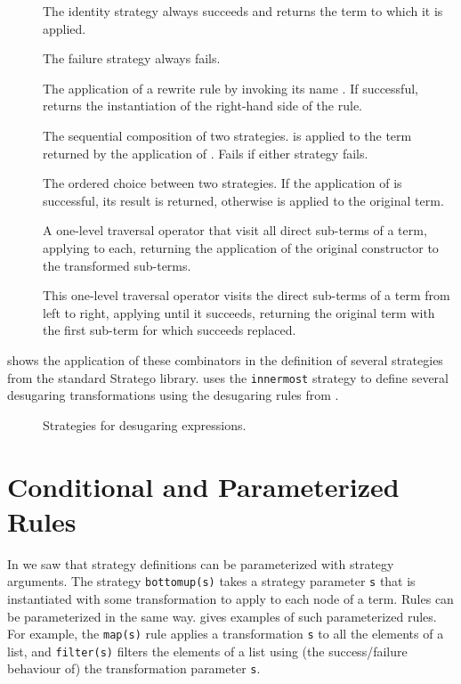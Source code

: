 \begin{description}
\item[] The identity strategy always succeeds and returns the term
to which it is applied.
\item[] The failure strategy always fails.
\item[] The application of a rewrite rule by invoking its name
. If successful, returns the instantiation of the right-hand side
of the rule.
\item[] The sequential composition of two strategies.
 is applied to the term returned by the
application of . Fails if either strategy fails.
\item[] The ordered choice between two strategies.
If the application of  is successful, its result is returned,
otherwise  is applied to the original term.
\item[] A one-level traversal operator that visit all direct
sub-terms of a term, applying  to each, returning the application
of the original constructor to the transformed sub-terms.
\item[] This one-level traversal operator visits the direct
sub-terms of a term from left to right, applying  until it
succeeds, returning the original term with the first sub-term for which
 succeeds replaced.
\end{description}

 shows the application of these combinators in the
definition of several strategies from the standard Stratego library.
 uses the \texttt{innermost} strategy to define several
desugaring transformations using the desugaring rules from
.

\begin{figure}[t]

\caption{Strategies for desugaring expressions.}
\end{figure}


\section{Conditional and Parameterized Rules}

In  we saw that strategy definitions can be parameterized
with strategy arguments. The strategy \texttt{bottomup(s)} takes a strategy
parameter \texttt{s} that is instantiated with some transformation to apply to
each node of a term. Rules can be parameterized in the same way.
 gives examples of such parameterized rules. For
example, the \texttt{map(s)} rule applies a transformation \texttt{s} to all the
elements of a list, and \texttt{filter(s)} filters the elements of a list using
(the success/failure behaviour of) the transformation parameter \texttt{s}. 

